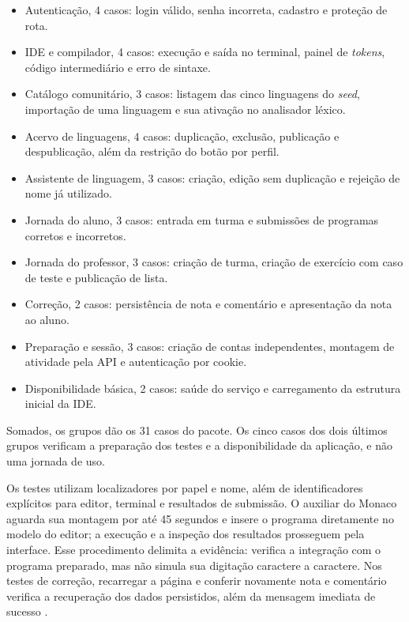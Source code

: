 \begin{itemize}
    \item Autenticação, 4 casos: login válido, senha incorreta, cadastro e proteção de rota.
    \item IDE e compilador, 4 casos: execução e saída no terminal, painel de \textit{tokens}, código intermediário e erro de sintaxe.
    \item Catálogo comunitário, 3 casos: listagem das cinco linguagens do \textit{seed}, importação de uma linguagem e sua ativação no analisador léxico.
    \item Acervo de linguagens, 4 casos: duplicação, exclusão, publicação e despublicação, além da restrição do botão por perfil.
    \item Assistente de linguagem, 3 casos: criação, edição sem duplicação e rejeição de nome já utilizado.
    \item Jornada do aluno, 3 casos: entrada em turma e submissões de programas corretos e incorretos.
    \item Jornada do professor, 3 casos: criação de turma, criação de exercício com caso de teste e publicação de lista.
    \item Correção, 2 casos: persistência de nota e comentário e apresentação da nota ao aluno.
    \item Preparação e sessão, 3 casos: criação de contas independentes, montagem de atividade pela API e autenticação por cookie.
    \item Disponibilidade básica, 2 casos: saúde do serviço e carregamento da estrutura inicial da IDE.
\end{itemize}

Somados, os grupos dão os 31 casos do pacote. Os cinco casos dos dois últimos grupos verificam a preparação dos testes e a disponibilidade da aplicação, e não uma jornada de uso.

Os testes utilizam localizadores por papel e nome, além de identificadores explícitos para editor, terminal e resultados de submissão. O auxiliar do Monaco aguarda sua montagem por até 45 segundos e insere o programa diretamente no modelo do editor; a execução e a inspeção dos resultados prosseguem pela interface. Esse procedimento delimita a evidência: verifica a integração com o programa preparado, mas não simula sua digitação caractere a caractere. Nos testes de correção, recarregar a página e conferir novamente nota e comentário verifica a recuperação dos dados persistidos, além da mensagem imediata de sucesso \cite{playwright2026practices}.

